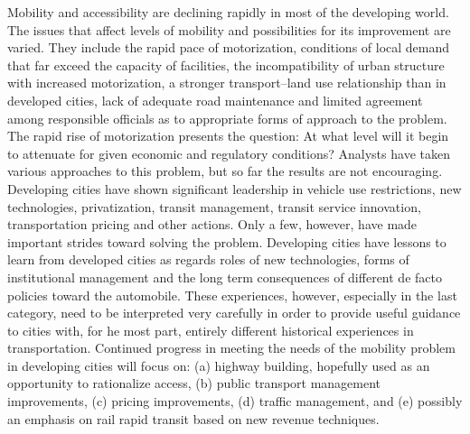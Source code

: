 Mobility and accessibility are declining rapidly in most of the developing world. The issues that affect levels of mobility and possibilities for its improvement are varied. They include the rapid pace of motorization, conditions of local demand that far exceed the capacity of facilities, the incompatibility of urban structure with increased motorization, a stronger transport–land use relationship than in developed cities, lack of adequate road maintenance and limited agreement among responsible officials as to appropriate forms of approach to the problem. The rapid rise of motorization presents the question: At what level will it begin to attenuate for given economic and regulatory conditions? Analysts have taken various approaches to this problem, but so far the results are not encouraging. Developing cities have shown significant leadership in vehicle use restrictions, new technologies, privatization, transit management, transit service innovation, transportation pricing and other actions. Only a few, however, have made important strides toward solving the problem. Developing cities have lessons to learn from developed cities as regards roles of new technologies, forms of institutional management and the long term consequences of different de facto policies toward the automobile. These experiences, however, especially in the last category, need to be interpreted very carefully in order to provide useful guidance to cities with, for he most part, entirely different historical experiences in transportation. Continued progress in meeting the needs of the mobility problem in developing cities will focus on: (a) highway building, hopefully used as an opportunity to rationalize access, (b) public transport management improvements, (c) pricing improvements, (d) traffic management, and (e) possibly an emphasis on rail rapid transit based on new revenue techniques.
